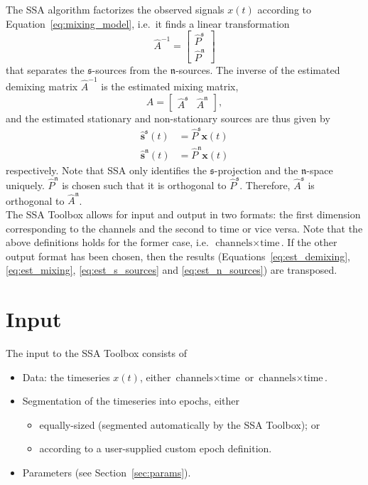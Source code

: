 \documentclass{article}
\newcommand{\1}{\ensuremath{\mathds{1}}}
\newcommand{\s}{\ensuremath{\mathfrak{s}}}
\newcommand{\n}{\ensuremath{\mathfrak{n}}}
\newcommand{\0}{\ensuremath{0}}
\begin{document}
The SSA algorithm factorizes the observed signals $x(t)$ according to
Equation~\ref{eq:mixing_model}, i.e.~it finds a linear transformation
\begin{equation}
\label{eq:est_demixing}
  \hat{A}^{-1} = \begin{bmatrix} \hat{P}^{\s} \\ \hat{P}^{\n} \end{bmatrix}
\end{equation}
that separates the \s-sources from the \n-sources. The inverse of the estimated 
demixing matrix $\hat{A}^{-1}$ is the estimated mixing matrix, 
\begin{equation}
\label{eq:est_mixing}
 \hat{A} = \begin{bmatrix} \hat{A}^{\s} & \hat{A}^{\n} \end{bmatrix}, 
\end{equation}
and the estimated stationary and non-stationary sources are thus given by
\begin{align}
\label{eq:est_s_sources}
  \hat{\mathbf s}^{\s}(t) & = \hat{P}^{\s} {\mathbf x}(t) \\
\label{eq:est_n_sources}
  \hat{\mathbf s}^{\n}(t) & = \hat{P}^{\n} {\mathbf x}(t) 
\end{align}
respectively.
Note that SSA only identifies the $\s$-projection and the $\n$-space uniquely.
$\hat P^{\n}$ is chosen such that it is orthogonal to $\hat P^{\s}$.
Therefore, $\hat A^{\s}$ is orthogonal to $\hat A^{\n}$.\\
The SSA Toolbox allows for input and output in two formats: the first
dimension corresponding to the channels and the second to time or vice versa.  
Note that the above definitions holds for the former case, 
i.e.~$\text{channels} \times \text{time}$. If the other output format has
been chosen, then the results (Equations~\ref{eq:est_demixing}, \ref{eq:est_mixing}, 
\ref{eq:est_s_sources} and \ref{eq:est_n_sources}) are transposed.

\section{Input}

The input to the SSA Toolbox consists of
\begin{itemize}
 \item Data: the timeseries $x(t)$, either $\text{channels} \times \text{time}$ or 
				$\text{channels} \times \text{time}$.

 \item Segmentation of the timeseries into epochs, either
	\begin{itemize}
	  \item equally-sized (segmented automatically by the SSA Toolbox); or 
	  \item according to a user-supplied custom epoch definition. 
	\end{itemize}

 \item Parameters (see Section~\ref{sec:params}).
\end{itemize}
\end{document}

